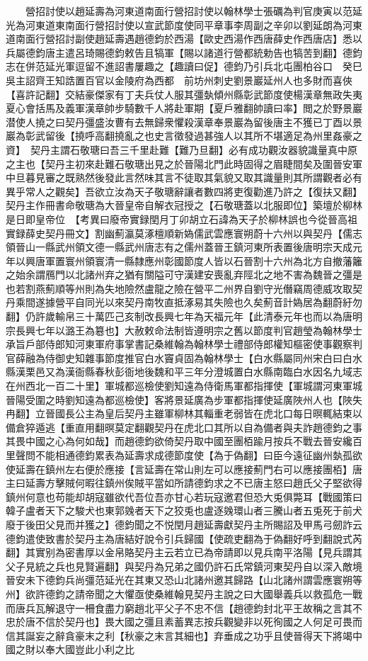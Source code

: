 　　營招討使以趙延壽為河東道南面行營招討使以翰林學士張礪為判官庚寅以范延光為河東道東南面行營招討使以宣武節度使同平章事李周副之辛卯以劉延朗為河東道南面行營招討副使趙延壽遇趙德鈞於西湯【歐史西湯作西唐薛史作西唐店】悉以兵屬德鈞唐主遣呂琦賜德鈞敕告且犒軍【賜以諸道行營都統勅告也犒苦到翻】德鈞志在併范延光軍逗留不進詔書屢趣之【趣讀曰促】德鈞乃引兵北屯團柏谷口　癸巳吳主詔齊王知誥置百官以金陵府為西都　前坊州刺史劉景巖延州人也多財而喜俠【喜許記翻】交結豪傑家有丁夫兵仗人服其彊埶傾州縣彰武節度使楊漢章無政失夷夏心會括馬及義軍漢章帥步騎數千人將赴軍期【夏戶雅翻帥讀曰率】閲之於野景巖潜使人撓之曰契丹彊盛汝曹有去無歸衆懼殺漢章奉景巖為留後唐主不獲已丁酉以景巖為彰武留後【撓呼高翻撓亂之也史言徵發過甚強人以其所不堪適足為州里姦豪之資】　契丹主謂石敬瑭曰吾三千里赴難【難乃旦翻】必有成功觀汝器貌識量真中原之主也【契丹主初來赴難石敬瑭出見之於晉陽北門此時固得之眉睫間矣及圍晉安軍中旦暮見審之既熟然後發此言然味其言不徒取其氣貌又取其識量則其所謂觀者必有異乎常人之觀矣】吾欲立汝為天子敬瑭辭讓者數四將吏復勸進乃許之【復扶又翻】契丹主作冊書命敬瑭為大晉皇帝自解衣冠授之【石敬瑭蓋以北服即位】築壇於柳林是日即皇帝位　【考異曰廢帝實録閏月丁卯胡立石諱為天子於柳林誤也今從晉高祖實録薛史契丹冊文】割幽薊瀛莫涿檀順新媯儒武雲應寰朔蔚十六州以與契丹【儒志領晉山一縣武州領文德一縣武州唐志有之儒州蓋晉王鎮河東所表置後唐明宗天成元年以興唐軍置寰州領寰清一縣隸應州彰國節度人皆以石晉割十六州為北方自撤藩籬之始余謂鴈門以北諸州弃之猶有關隘可守漢建安喪亂弃陘北之地不害為魏晉之彊是也若割燕薊順等州則為失地險然盧龍之險在營平二州界自劉守光僭竊周德威攻取契丹乘間遂據營平自同光以來契丹南牧直抵涿易其失險也久矣薊音計媯居為翻蔚紆勿翻】仍許歲輸帛三十萬匹己亥制改長興七年為天福元年【此清泰元年也而以為唐明宗長興七年以潞王為簒也】大赦敕命法制皆遵明宗之舊以節度判官趙瑩為翰林學士承旨戶部侍郎知河東軍府事掌書記桑維翰為翰林學士禮部侍郎權知樞密使事觀察判官薛融為侍御史知雜事節度推官白水竇貞固為翰林學士【白水縣屬同州宋白曰白水縣漢栗邑又為漢衙縣春秋彭衙地後魏和平三年分澄城置白水縣南臨白水因名九域志在州西北一百二十里】軍城都巡檢使劉知遠為侍衛馬軍都指揮使【軍城謂河東軍城晉陽受圍之時劉知遠為都巡檢使】客將景延廣為步軍都指揮使延廣陜州人也【陜失冉翻】立晉國長公主為皇后契丹主雖軍柳林其輜重老弱皆在虎北口每日暝輒結束以備倉猝遁逃【重直用翻暝莫定翻觀契丹在虎北口其所以自為備者與夫詐趙德鈞之事其畏中國之心為何如哉】而趙德鈞欲倚契丹取中國至團栢踰月按兵不戰去晉安纔百里聲問不能相通德鈞累表為延壽求成德節度使【為于偽翻】曰臣今遠征幽州埶孤欲使延壽在鎮州左右便於應接【言延壽在常山則左可以應接薊門右可以應接團栢】唐主曰延壽方擊賊何暇往鎮州俟賊平當如所請德鈞求之不已唐主怒曰趙氏父子堅欲得鎮州何意也苟能却胡寇雖欲代吾位吾亦甘心若玩寇邀君但恐大兎俱斃耳【戰國策曰韓子盧者天下之駿犬也東郭㕙者天下之狡兎也盧逐㕙環山者三騰山者五兎死于前犬廢于後田父見而并獲之】德鈞聞之不悦閏月趙延壽獻契丹主所賜詔及甲馬弓劒詐云德鈞遣使致書於契丹主為唐結好說令引兵歸國【使疏吏翻為于偽翻好呼到翻說式芮翻】其實别為密書厚以金帛賂契丹主云若立已為帝請即以見兵南平洛陽【見兵謂其父子見統之兵也見賢遍翻】與契丹為兄弟之國仍許石氏常鎮河東契丹自以深入敵境晉安未下德鈞兵尚彊范延光在其東又恐山北諸州邀其歸路【山北諸州謂雲應寰朔等州】欲許德鈞之請帝聞之大懼亟使桑維翰見契丹主說之曰大國舉義兵以救孤危一戰而唐兵瓦解退守一柵食盡力窮趙北平父子不忠不信【趙德鈞封北平王故稱之言其不忠於唐不信於契丹也】畏大國之彊且素蓄異志按兵觀變非以死徇國之人何足可畏而信其誕妄之辭貪豪末之利【秋豪之末言其細也】弃垂成之功乎且使晉得天下將竭中國之財以奉大國豈此小利之比